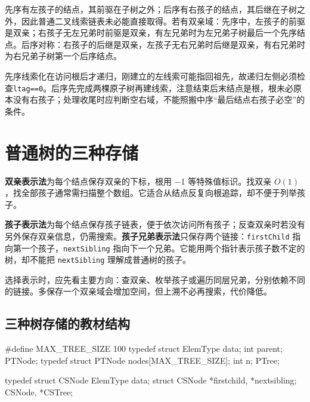 先序有左孩子的结点，其前驱在子树之外；后序有右孩子的结点，其后继在子树之外，因此普通二叉线索链表未必能直接取得。若有双亲域：先序中，左孩子的前驱是双亲；右孩子无左兄弟时前驱是双亲，有左兄弟时为左兄弟子树最后一个先序结点。后序对称：右孩子的后继是双亲，左孩子无右兄弟时后继是双亲，有右兄弟时为右兄弟子树第一个后序结点。

先序线索化在访问根后才递归，刚建立的左线索可能指回祖先，故递归左侧必须检查\texttt{ltag=\allowbreak{}=\allowbreak{}0}。后序先完成两棵原子树再建线索，注意结束后末结点是根，根未必原本没有右孩子；处理收尾时应判断空右域，不能照搬中序``最后结点右孩子必空''的条件。

\section{普通树的三种存储}\label{DS05-06}

\textbf{双亲表示法}为每个结点保存双亲的下标，根用 \ensuremath{-}1 等特殊值标识。找双亲 \(O(1)\)，找全部孩子通常需扫描整个数组。它适合从结点反复向根追踪，却不便于列举孩子。

\textbf{孩子表示法}为每个结点保存孩子链表，便于依次访问所有孩子；反查双亲时若没有另外保存双亲信息，仍需搜索。\textbf{孩子兄弟表示法}只保存两个链接：\texttt{firstChild} 指向第一个孩子，\texttt{nextSibling} 指向下一个兄弟。它能用两个指针表示孩子数不定的树，却不能把 \texttt{nextSibling} 理解成普通树的孩子。

选择表示时，应先看主要方向：查双亲、枚举孩子或遍历同层兄弟，分别依赖不同的链接。多保存一个双亲域会增加空间，但上溯不必再搜索，代价降低。

\subsection{三种树存储的教材结构}\label{DS05-tree-storage-code}

\par\medskip\noindent\begin{minipage}{\linewidth}
\begin{codeblock}[language=C++]
#define MAX_TREE_SIZE 100
typedef struct {
    ElemType data;
    int parent;
} PTNode;
typedef struct {
    PTNode nodes[MAX_TREE_SIZE];
    int n;
} PTree;

typedef struct CSNode {
    ElemType data;
    struct CSNode *firstchild, *nextsibling;
} CSNode, *CSTree;
\end{codeblock}
\end{minipage}\par\medskip

